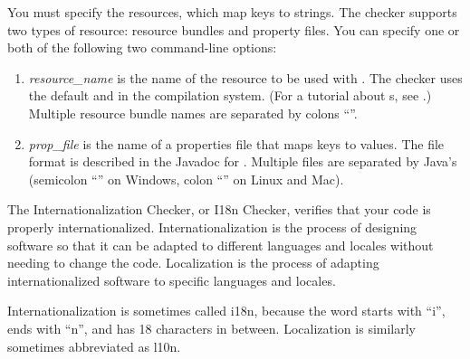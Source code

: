 You must specify the resources, which map keys to strings.
The checker supports two types of resource:
resource bundles and property files.  You can specify one or both of the
following two command-line options:

\begin{enumerate}

\item {}

  \emph{resource\_name} is the name of the resource to be used with
  .
  The checker uses the default  and  in the
  compilation system.
  (For a tutorial about s, see
  .)
  Multiple resource bundle names are separated by colons ``\code{:}''.

\item {}

  \emph{prop\_file} is the name of a properties file that maps
  keys to values.  The file format is described in
  the Javadoc for
  .
  Multiple files are separated by Java's
  (semicolon ``\code{;}'' on Windows, colon ``\code{:}'' on Linux and
  Mac).

\end{enumerate}




The Internationalization Checker, or I18n Checker, verifies that your code is properly
internationalized.  Internationalization is the process of designing software so that
it can be adapted to different languages and locales without needing to change the code.
Localization is the process of adapting internationalized software to specific languages
and locales.

Internationalization is sometimes called i18n, because the word starts with ``i'',
ends with ``n'', and has 18 characters in between.  Localization is similarly
sometimes abbreviated as l10n.

